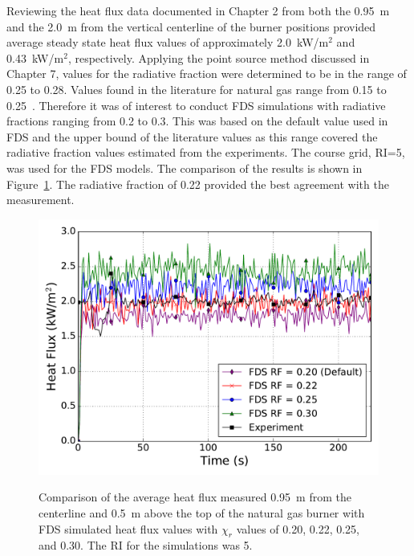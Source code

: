 \documentclass[twoside]{uocthesis}
\begin{document}
{Reviewing the heat flux data documented in Chapter 2 from both the 0.95~m  and the 2.0~m from the vertical centerline of the burner positions provided average steady state heat flux values of approximately 2.0~kW/m$^2$ and 0.43~kW/m$^2$, respectively.  Applying the point source method discussed in Chapter 7, values for the radiative fraction were determined to be in the range of 0.25 to 0.28.  Values found in the literature for natural gas range from 0.15 to 0.25~\cite{Modak:1977,Hostikka:3}.   
Therefore it was of interest to conduct FDS simulations with radiative fractions ranging from 0.2 to 0.3.  This was based on the default value used in FDS and the upper bound of the literature values as this range covered the radiative fraction values estimated from the experiments.  The course grid, RI=5, was used for the FDS models.  The comparison of the results is shown in Figure~\ref{FHNG01_HF_RI5}.  The radiative fraction of 0.22 provided the best agreement with the measurement.  

\begin{figure}
	\includegraphics[width=5in]{../Figures/FHNG01_HF_RI5} \\
	\caption[Comparison of the average heat flux measured 0.95~m from the centerline and 0.5~m above the top of the natural gas burner with FDS simulated heat flux values based on varied $\chi_r$ values.]{Comparison of the average heat flux measured 0.95~m from the centerline and 0.5~m above the top of the natural gas burner with FDS simulated heat flux values with $\chi_r$ values of 0.20, 0.22, 0.25, and 0.30.  The RI for the simulations was 5.}
	\label{FHNG01_HF_RI5}
\end{figure}

}
\end{document}
